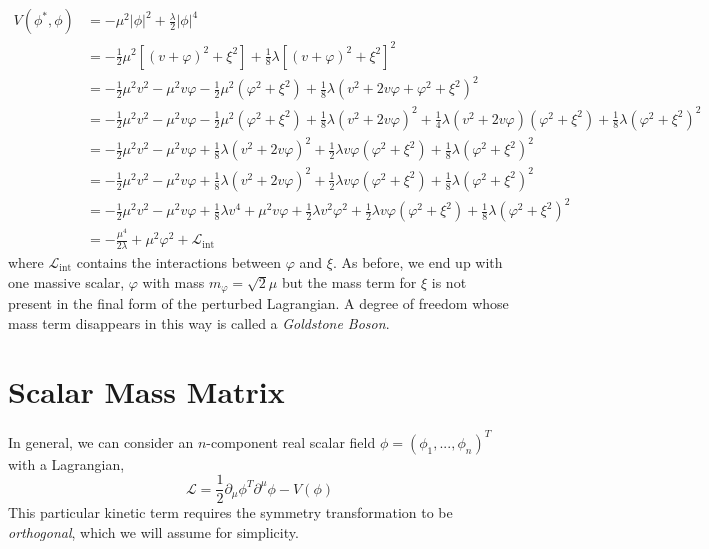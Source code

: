 \begin{equation}
\begin{split}
    V(\phi^*,\phi) &= -\mu^2|\phi|^2 +\frac{\lambda}{2}|\phi|^4 \\
    &=-\frac{1}{2}\mu^2[(v + \varphi)^2 + \xi^2] +\frac{1}{8}\lambda[(v + \varphi)^2 + \xi^2]^2\\
    &=-\frac{1}{2}\mu^2v^2 -\mu^2v\varphi -\frac{1}{2}\mu^2(\varphi^2 + \xi^2) +\frac{1}{8}\lambda(v^2 + 2v\varphi + \varphi^2 + \xi^2)^2\\
    &=-\frac{1}{2}\mu^2v^2 -\mu^2v\varphi -\frac{1}{2}\mu^2(\varphi^2 + \xi^2) +\frac{1}{8}\lambda(v^2 + 2v\varphi)^2 +\frac{1}{4}\lambda(v^2 + 2v\varphi)(\varphi^2 + \xi^2)
    + \frac{1}{8}\lambda(\varphi^2 + \xi^2)^2\\
    &=-\frac{1}{2}\mu^2v^2 -\mu^2v\varphi  +\frac{1}{8}\lambda(v^2 + 2v\varphi)^2 + \frac{1}{2}\lambda v\varphi(\varphi^2 + \xi^2)
    + \frac{1}{8}\lambda(\varphi^2 + \xi^2)^2\\
    &=-\frac{1}{2}\mu^2v^2 -\mu^2v\varphi  +\frac{1}{8}\lambda(v^2 + 2v\varphi)^2 + \frac{1}{2}\lambda v\varphi(\varphi^2 + \xi^2)
    + \frac{1}{8}\lambda(\varphi^2 + \xi^2)^2\\
    &=-\frac{1}{2}\mu^2v^2 -\mu^2v\varphi  +\frac{1}{8}\lambda v^4 + \mu^2v\varphi + \frac{1}{2}\lambda v^2\varphi^2 + \frac{1}{2}\lambda v\varphi(\varphi^2 + \xi^2)
    + \frac{1}{8}\lambda(\varphi^2 + \xi^2)^2\\
    &=-\frac{\mu^4}{2\lambda} + \mu^2\varphi^2 + \mathcal{L}_{\text{int}}
\end{split}
\end{equation}
where $\mathcal{L}_{\text{int}}$ contains the interactions between $\varphi$ and $\xi$. As before, we end up with one massive scalar, $\varphi$ with mass $m_{\varphi} = \sqrt{2}\mu$ but the mass term for $\xi$ is not present in the final form of the perturbed Lagrangian. A degree of freedom whose mass term disappears in this way is called a \textit{Goldstone Boson}.

\section{Scalar Mass Matrix}
In general, we can consider an $n$-component real scalar field $\phi = (\phi_1, ..., \phi_n)^T$ with a Lagrangian, 
\begin{equation}
    \mathcal{L} = \frac{1}{2}\partial_{\mu}\phi^T\partial^{\mu}\phi - V(\phi)
\end{equation}
This particular kinetic term requires the symmetry transformation to be \textit{orthogonal}, which we will assume for simplicity. 

